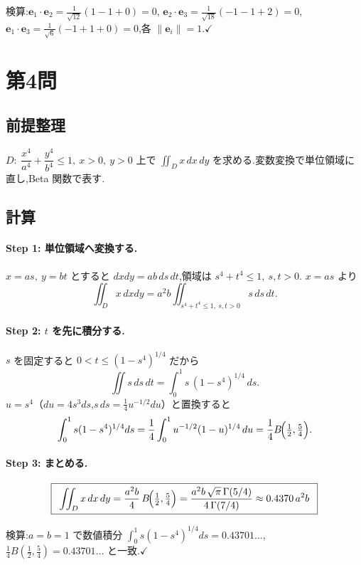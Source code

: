 \documentclass[11pt,a4paper]{article}
\begin{document}
検算:$\bm{e}_1\cdot\bm{e}_2=\frac{1}{\sqrt{12}}(1-1+0)=0$,
$\bm{e}_2\cdot\bm{e}_3=\frac{1}{\sqrt{18}}(-1-1+2)=0$,
$\bm{e}_1\cdot\bm{e}_3=\frac{1}{\sqrt6}(-1+1+0)=0$,各 $\|\bm{e}_i\|=1$.$\checkmark$

\section*{第4問}

\subsection*{前提整理}

$D:\ \dfrac{x^4}{a^4}+\dfrac{y^4}{b^4}\le1,\ x>0,\ y>0$ 上で
$\displaystyle\iint_D x\,dx\,dy$ を求める.変数変換で単位領域に直し,Beta 関数で表す.

\subsection*{計算}

\paragraph{Step 1: 単位領域へ変換する.}
$x=as,\ y=bt$ とすると $dxdy=ab\,ds\,dt$,領域は $s^4+t^4\le1,\ s,t>0$.
$x=as$ より
\[
\iint_D x\,dxdy=a^2b\iint_{s^4+t^4\le1,\ s,t>0} s\,ds\,dt.
\]

\paragraph{Step 2: $t$ を先に積分する.}
$s$ を固定すると $0<t\le(1-s^4)^{1/4}$ だから
\[
\iint s\,ds\,dt=\int_0^1 s\,(1-s^4)^{1/4}\,ds.
\]
$u=s^4$（$du=4s^3ds$,$s\,ds=\tfrac14 u^{-1/2}du$）と置換すると
\[
\int_0^1 s(1-s^4)^{1/4}ds
=\frac14\int_0^1 u^{-1/2}(1-u)^{1/4}\,du
=\frac14 B\!\Bigl(\tfrac12,\tfrac54\Bigr).
\]

\paragraph{Step 3: まとめる.}
\[
\ans{\
\iint_D x\,dx\,dy=\frac{a^2b}{4}\,B\!\Bigl(\tfrac12,\tfrac54\Bigr)
=\frac{a^2b\,\sqrt\pi\,\Gamma(5/4)}{4\,\Gamma(7/4)}\approx0.4370\,a^2b\ }
\]

検算:$a=b=1$ で数値積分 $\displaystyle\int_0^1 s(1-s^4)^{1/4}ds=0.43701\ldots$,
$\tfrac14B(\tfrac12,\tfrac54)=0.43701\ldots$ と一致.$\checkmark$
\end{document}
